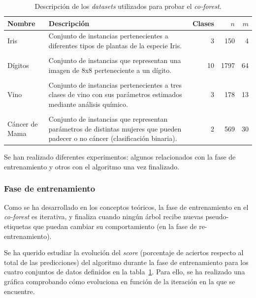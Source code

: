 \begin{table}
	\small
	\begin{centering}
		
		\begin{tabular}{@{}p{4em} p{20em} r r r @{}}
			\toprule
			\textbf{Nombre} & \textbf{Descripción} & \textbf{Clases} & $n$ & $m$\\ 
			\midrule
			
			Iris & Conjunto de instancias pertenecientes a diferentes tipos de plantas de la especie Iris. & 3 & 150 & 4 \\\\
			Dígitos & Conjunto de instancias que representan una imagen de 8x8 perteneciente a un dígito. & 10 & 1797 & 64 \\\\
			Vino & Conjunto de instancias pertenecientes a tres clases de vino con sus parámetros estimados mediante análisis químico. & 3 & 178 & 13 \\\\
			Cáncer de Mama & Conjunto de instancias que representan parámetros de distintas mujeres que pueden padecer o no cáncer (clasificación binaria). & 2 & 569 & 30 \\
			
			\bottomrule
			
		\end{tabular}
		
	\end{centering}
	\caption{Descripción de los \textit{datasets} utilizados para probar el \textit{co-forest}.}
	\label{tabla_datasets_sklearn}	
\end{table}


Se han realizado diferentes experimentos: algunos relacionados con la fase de entrenamiento y otros con el algoritmo una vez finalizado.

\subsubsection{Fase de entrenamiento}

Como se ha desarrollado en los conceptos teóricos, la fase de entrenamiento en el \textit{co-forest} es iterativa, y finaliza cuando ningún árbol recibe nuevas pseudo-etiquetas que puedan cambiar su comportamiento (en la fase de re-entrenamiento).

Se ha querido estudiar la evolución del \textit{score} (porcentaje de aciertos respecto al total de las predicciones) del algoritmo durante la fase de entrenamiento para los cuatro conjuntos de datos definidos en la tabla~\ref{tabla_datasets_sklearn}. Para ello, se ha realizado una gráfica comprobando cómo evoluciona en función de la iteración en la que se encuentre.

